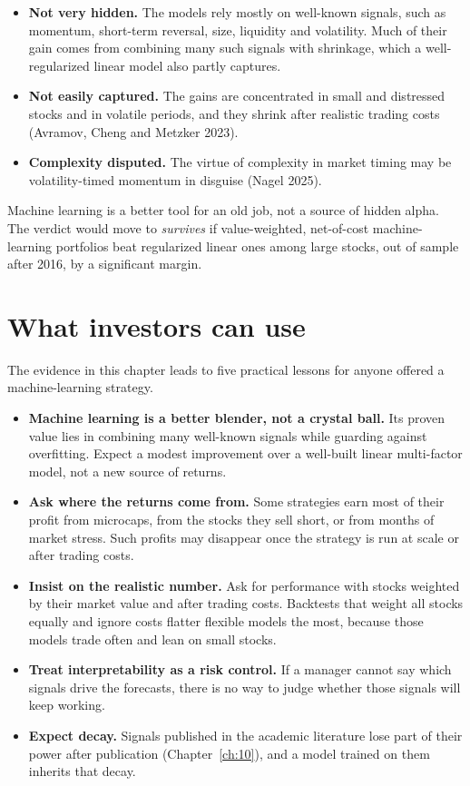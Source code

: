 \begin{itemize}
  \item \textbf{Not very hidden.} The models rely mostly on well-known signals, such as momentum, short-term reversal, size, liquidity and volatility. Much of their gain comes from combining many such signals with shrinkage, which a well-regularized linear model also partly captures.
  \item \textbf{Not easily captured.} The gains are concentrated in small and distressed stocks and in volatile periods, and they shrink after realistic trading costs (Avramov, Cheng and Metzker 2023).
  \item \textbf{Complexity disputed.} The virtue of complexity in market timing may be volatility-timed momentum in disguise (Nagel 2025).
\end{itemize}

Machine learning is a better tool for an old job, not a source of hidden alpha. The verdict would move to \emph{survives} if value-weighted, net-of-cost machine-learning portfolios beat regularized linear ones among large stocks, out of sample after 2016, by a significant margin.


\section{What investors can use}
\label{sec:21-investors}

The evidence in this chapter leads to five practical lessons for anyone offered a machine-learning strategy.

\begin{itemize}
  \item \textbf{Machine learning is a better blender, not a crystal ball.} Its proven value lies in combining many well-known signals while guarding against overfitting. Expect a modest improvement over a well-built linear multi-factor model, not a new source of returns.
  \item \textbf{Ask where the returns come from.} Some strategies earn most of their profit from microcaps, from the stocks they sell short, or from months of market stress. Such profits may disappear once the strategy is run at scale or after trading costs.
  \item \textbf{Insist on the realistic number.} Ask for performance with stocks weighted by their market value and after trading costs. Backtests that weight all stocks equally and ignore costs flatter flexible models the most, because those models trade often and lean on small stocks.
  \item \textbf{Treat interpretability as a risk control.} If a manager cannot say which signals drive the forecasts, there is no way to judge whether those signals will keep working.
  \item \textbf{Expect decay.} Signals published in the academic literature lose part of their power after publication (Chapter~\ref{ch:10}), and a model trained on them inherits that decay.
\end{itemize}
